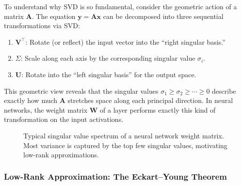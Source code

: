 To understand why SVD is so fundamental, consider the geometric action of a matrix $\mathbf{A}$. The equation $\mathbf{y} = \mathbf{A}\mathbf{x}$ can be decomposed into three sequential transformations via SVD:
\begin{enumerate}
    \item $\mathbf{V}^\top$: Rotate (or reflect) the input vector into the ``right singular basis.''
    \item $\Sigma$: Scale along each axis by the corresponding singular value $\sigma_i$.
    \item $\mathbf{U}$: Rotate into the ``left singular basis'' for the output space.
\end{enumerate}
This geometric view reveals that the singular values $\sigma_1 \geq \sigma_2 \geq \cdots \geq 0$ describe exactly how much $\mathbf{A}$ stretches space along each principal direction. In neural networks, the weight matrix $\mathbf{W}$ of a layer performs exactly this kind of transformation on the input activations.

\begin{figure}[htbp]
    \centering
    \caption[Singular value spectrum]{Typical singular value spectrum of a neural network weight matrix. Most variance is captured by the top few singular values, motivating low-rank approximations.}
    \label{fig:svd_spectrum}
\end{figure}

\subsubsection{Low-Rank Approximation: The Eckart--Young Theorem}

